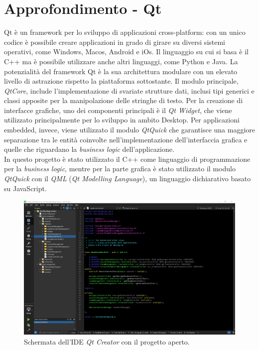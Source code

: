 \section{Approfondimento - Qt}
Qt è un framework per lo sviluppo di applicazioni cross-platform: con un unico codice è possibile creare applicazioni in grado di girare su diversi sistemi operativi, come Windows, Macos, Android e iOs. Il linguaggio su cui si basa è il C++ ma è possibile utilizzare anche altri linguaggi, come Python e Java. La potenzialità del framework Qt è la sua architettura modulare con un elevato livello di astrazione rispetto la piattaforma sottostante. Il modulo principale, \textit{QtCore}, include l'implementazione di svariate strutture dati, inclusi tipi generici e classi apposite per la manipolazione delle stringhe di testo. Per la creazione di interfacce grafiche, uno dei componenti principali è il \textit{Qt Widget}, che viene utilizzato principalmente per lo sviluppo in ambito Desktop. Per applicazioni embedded, invece, viene utilizzato il modulo \textit{QtQuick} che garantisce una maggiore separazione tra le entità coinvolte nell'implementazione dell'interfaccia grafica e quelle che riguardano la \textit{business logic} dell'applicazione. 
\\
In questo progetto è stato utilizzato il C++ come linguaggio di programmazione per la \textit{business logic}, mentre per la parte grafica è stato utilizzato il modulo \textit{QtQuick} con il \textit{QML} (\textit{Qt Modelling Language}), un linguaggio dichiarativo basato su JavaScript. 

\begin{figure}[h!]
	\centering
	\includegraphics[width=0.8\linewidth]{./Conclusione/ImageFiles/Qt Framework}
	\caption{Schermata dell'IDE \textit{Qt Creator} con il progetto aperto.}
	\label{fig:qtFramework}
\end{figure}

